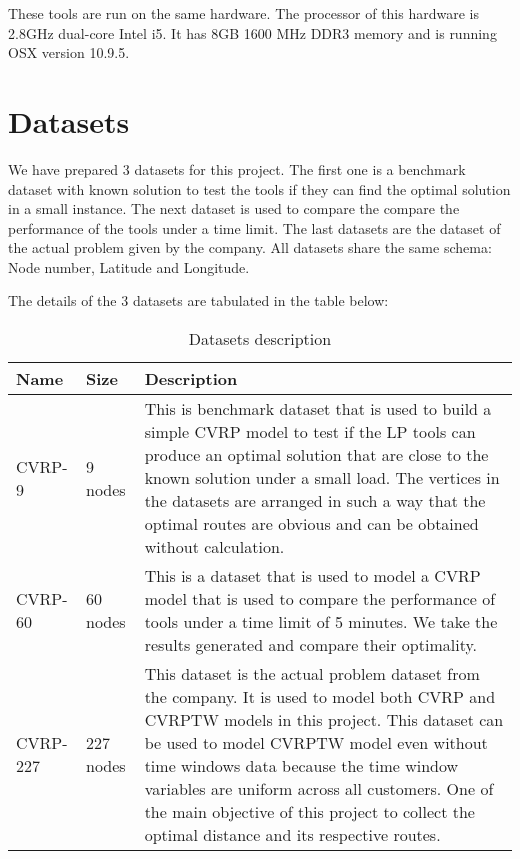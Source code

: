 These tools are run on the same hardware. The processor of this hardware is 2.8GHz dual-core Intel i5. It has
8GB 1600 MHz DDR3 memory and is running OSX version 10.9.5.

\section{Datasets}
We have prepared 3 datasets for this project. The first one is a benchmark dataset with known solution to test the tools
if they can find the optimal solution in a small instance. The next dataset is used to compare the compare the performance
of the tools under a time limit. The last datasets are the dataset of the actual problem given by the company. All datasets
share the same schema: Node number, Latitude and Longitude.

The details of the 3 datasets are tabulated in the table below:
\begin{table}[!ht]
    \begin{center}
        \begin{tabular}{ | l | l | p{10.5cm} |}
        \hline
        Name & Size  & Description \\ \hline
        CVRP-9 & 9 nodes  & This is benchmark dataset that is used to build a simple CVRP model to test
        if the LP tools can produce an optimal solution that are close to the known solution under a small load. The vertices in the datasets
        are arranged in such a way that the optimal routes are obvious and can be obtained without calculation.\\ \hline
        CVRP-60 & 60 nodes & This is a dataset that is used to model a CVRP model that is used to compare the performance of tools
        under a time limit of 5 minutes. We take the results generated and compare their optimality.\\ \hline
        CVRP-227 & 227 nodes & This dataset is the actual problem dataset from the company. It is used to model both CVRP and CVRPTW models
        in this project. This dataset can be used to model CVRPTW model even without time windows data because the time window variables are uniform across
        all customers. One of the main objective of this project to collect the optimal distance and its respective routes.\\
        \hline
        \end{tabular}
        \caption{Datasets description}
        \label{table:dataset_description}
    \end{center}
\end{table}

